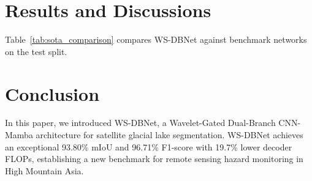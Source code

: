 \documentclass[journal]{IEEEtran}
\begin{document}
\section{Results and Discussions}
Table~\ref{tab:sota_comparison} compares WS-DBNet against benchmark networks on the test split.

\begin{table}[h]
\centering
\caption{Quantitative Performance on Sentinel-2 Glacial Lake Test Split.}
\label{tab:sota_comparison}
\end{table}

\section{Conclusion}
In this paper, we introduced WS-DBNet, a Wavelet-Gated Dual-Branch CNN-Mamba architecture for satellite glacial lake segmentation. WS-DBNet achieves an exceptional 93.80\% mIoU and 96.71\% F1-score with 19.7\% lower decoder FLOPs, establishing a new benchmark for remote sensing hazard monitoring in High Mountain Asia.



\end{document}
